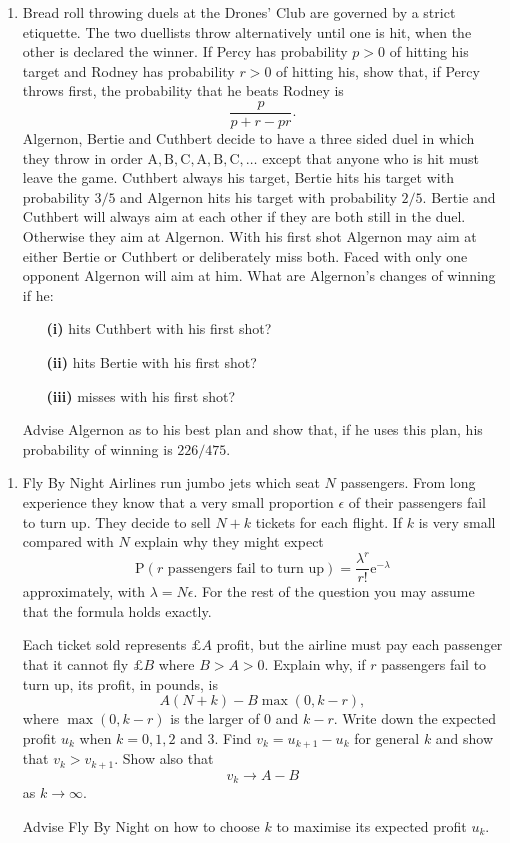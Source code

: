 \documentclass[a4, 11pt]{report}
\newlength{\qspace}
\newcounter{qnumber}
\newenvironment{question}%
 {\vspace{\qspace}
  \begin{enumerate}[\bfseries 1\quad][10]%
    \setcounter{enumi}{\value{qnumber}}%
    \item%
 }
{
  \end{enumerate}
  \filbreak
  \stepcounter{qnumber}
 }
\begin{document}
\begin{question}
Bread roll throwing duels at the Drones' Club are governed by a strict
etiquette. The two duellists throw alternatively until one is hit,
when the other is declared the winner. If Percy has probability $p>0$
of hitting his target and Rodney has probability $r>0$ of hitting
his, show that, if Percy throws first, the probability that he beats
Rodney is 
\[
\frac{p}{p+r-pr}.
\]
Algernon, Bertie and Cuthbert decide to have a three sided duel in
which they throw in order $\mathrm{A,B,C,A,B,C,}\ldots$ except that
anyone who is hit must leave the game. Cuthbert always his target,
Bertie hits his target with probability $3/5$ and Algernon hits his
target with probability $2/5.$ Bertie and Cuthbert will always aim
at each other if they are both still in the duel. Otherwise they aim
at Algernon. With his first shot Algernon may aim at either Bertie
or Cuthbert or deliberately miss both. Faced with only one opponent
Algernon will aim at him. What are Algernon's changes of winning if
he: 

\begin{itemize}
\setlength{\itemsep}{3mm}

\item[\bf (i)] hits Cuthbert with his first shot?
\item[\bf (ii)] hits Bertie with his first shot?
\item[\bf (iii)] misses with his first shot?
\end{itemize}

Advise Algernon as to his best plan and show that, if he uses this
plan, his probability of winning is $226/475.$
\end{question}

\begin{question}
Fly By Night Airlines run jumbo jets which seat $N$ passengers. From
long experience they know that a very small proportion $\epsilon$
of their passengers fail to turn up. They decide to sell $N+k$ tickets
for each flight. If $k$ is very small compared with $N$ explain
why they might expect 
\[
\mathrm{P}(r\mbox{ passengers fail to turn up})=\frac{\lambda^{r}}{r!}\mathrm{e}^{-\lambda}
\]
approximately, with $\lambda=N\epsilon.$ For the rest of the question
you may assume that the formula holds exactly. 


Each ticket sold represents $\pounds A$ profit, but the airline must
pay each passenger that it cannot fly $\pounds B$ where $B>A>0.$
Explain why, if $r$ passengers fail to turn up, its profit, in pounds,
is 
\[
A(N+k)-B\max(0,k-r),
\]
where $\max(0,k-r)$ is the larger of $0$ and $k-r.$ Write down
the expected profit $u_{k}$ when $k=0,1,2$ and $3.$ Find $v_{k}=u_{k+1}-u_{k}$
for general $k$ and show that $v_{k}>v_{k+1}.$ Show also that 
\[
v_{k}\rightarrow A-B
\]
as $k\rightarrow\infty.$


Advise Fly By Night on how to choose $k$ to maximise its expected
profit $u_{k}.$ 
\end{question}
\end{document}
